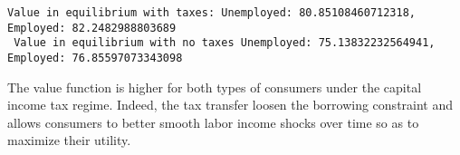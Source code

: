 \documentclass[11pt]{article}
\makeatletter
\newcommand{\boxspacing}{\kern\kvtcb@left@rule\kern\kvtcb@boxsep}
\newcommand{\prompt}[4]{
        \ttfamily\llap{{\color{#2}[#3]:\hspace{3pt}#4}}\vspace{-\baselineskip}
    }
\makeatother
\begin{document}
    \begin{Verbatim}[commandchars=\\\{\}]
Value in equilibrium with taxes: Unemployed: 80.85108460712318, Employed: 82.2482988803689
 Value in equilibrium with no taxes Unemployed: 75.13832232564941, Employed: 76.85597073343098
    \end{Verbatim}

    The value function is higher for both types of consumers under the
capital income tax regime. Indeed, the tax transfer loosen the borrowing
constraint and allows consumers to better smooth labor income shocks over
time so as to maximize their utility.

    \begin{tcolorbox}[breakable, size=fbox, boxrule=1pt, pad at break*=1mm,colback=cellbackground, colframe=cellborder]
\prompt{In}{incolor}{ }{\boxspacing}
\begin{Verbatim}[commandchars=\\\{\}]

\end{Verbatim}
\end{tcolorbox}


    
    
    
\end{document}
